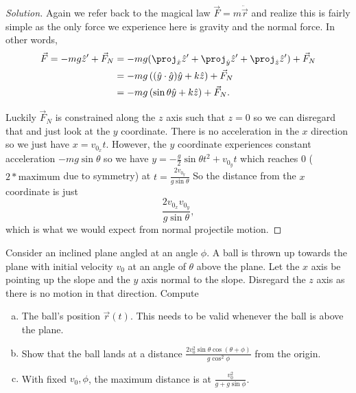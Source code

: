 \documentclass{article}
\begin{document}
\begin{proof}[Solution]
Again we refer back to the magical law $\vec{F} = m \ddot{\vec{r}}$ and
realize this is fairly simple as the only force we experience here is
gravity and the normal force. In other words,
\[ \begin{aligned}
\vec{F} = -mg \hat{z}' + \vec{F}_N &= -mg(\proj_{\hat{x}} \hat{z}' +
\proj_{\hat{y}} \hat{z}' + \proj_{\hat{z}} \hat{z}') + \vec{F}_N \\
&= -mg\left( (\hat{y} \cdot \hat{g}) \hat{y} + k \hat{z} \right) +
\vec{F}_N \\
&= -mg \left( \sin \theta \hat{y} + k \hat{z} \right) + \vec{F}_N.
\end{aligned} \]

Luckily $\vec{F}_N$ is constrained along the $z$ axis such that $z = 0$
so we can disregard that and just look at the $y$ coordinate. There is
no acceleration in the $x$ direction so we just have $x = v_{0_x} t$.
However, the $y$ coordinate experiences constant acceleration $-mg \sin
\theta$ so we have $y = - \frac{g}{2} \sin \theta t^2 + v_{0_y} t$ which
reaches $0$ ($2 * \textrm{maximum}$ due to symmetry) at $t = \frac{2
v_{0_y}}{g \sin \theta}$ So the distance from the $x$ coordinate is just
\[ \boxed{\frac{2 v_{0_x} v_{0_y}}{g \sin \theta}}, \]
which is what we would expect from normal projectile motion.
\end{proof}

\begin{prb}
Consider an inclined plane angled at an angle $\phi$. A ball is thrown
up towards the plane with initial velocity $v_0$ at an angle of $\theta$
above the plane. Let the $x$ axis be pointing up the slope and the $y$
axis normal to the slope. Disregard the $z$ axis as there is no motion
in that direction. Compute

\begin{enumerate}[(a)]
\item The ball's position $\vec{r}(t)$. This needs to be valid whenever
the ball is above the plane.
\item Show that the ball lands at a distance $\frac{2 v_0^2 \sin \theta
\cos (\theta + \phi)}{g \cos^2 \phi}$ from the origin.
\item With fixed $v_0, \phi$, the maximum distance is at $\frac{v_0^2}{g
+ g \sin \phi}$.
\end{enumerate}
\end{prb}
\end{document}
